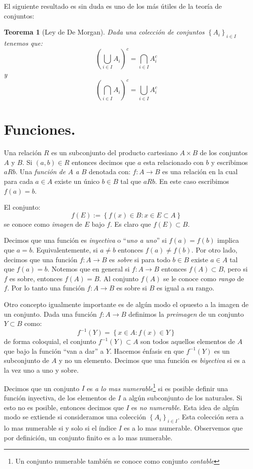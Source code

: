 \documentclass[14pt]{extreport}
\newtheorem{teo}{Teorema}
\begin{document}
El siguiente resultado es sin duda es uno de los más útiles de la teoría de conjuntos:
\begin{teo}[Ley de De Morgan]
Dada una colección de conjuntos $\left\{A_i\right\}_{i\in I}$ tenemos que:
$$
\left(\bigcup_{i\in I} A_i\right)^c =\bigcap_{i\in I} A_i^c
$$
y 
$$
\left(\bigcap_{i\in I} A_i\right)^c =\bigcup_{i\in I} A_i^c
$$
\end{teo}

\section{Funciones.}
Una relación $R$ es un subconjunto del producto cartesiano $A\times B$ de los conjuntos $A$ y $B$. Si $(a,b)\in R$ entonces decimos que $a$ esta relacionado con $b$ y escribimos $aRb$. Una \emph{función de $A$ a $B$} denotada con: $f:A\to B$ es una relación en la cual para cada $a\in A$ existe un único $b\in B$ tal que $aRb$. En este caso escribimos $f(a) = b$.

El conjunto:
$$
f(E) := \left\{f(x)\in B: x\in E\subset A\right\} 
$$
se conoce como \emph{imagen} de $E$ bajo $f$. Es claro que $f(E) \subset B$.

Decimos que una función es \emph{inyectiva} o ``\emph{uno a uno}'' si $f(a) = f(b)$ implica que $a=b$. Equivalentemente, si $a\neq b$ entonces $f(a)\neq f(b)$. Por otro lado, decimos que una función $f:A\rightarrow B$ es \emph{sobre} si para todo $b\in B$ existe $a\in A$ tal que $f(a)=b$. Notemos que en general si $f:A\rightarrow B$ entonces $f(A)\subset B$, pero si $f$ es sobre, entonces $f(A) = B$. Al conjunto $f(A)$ se le conoce como \emph{rango} de $f$. Por lo tanto una función $f:A\rightarrow B$ es sobre si $B$ es igual a su rango.

Otro concepto igualmente importante es de algún modo el opuesto a la imagen de un conjunto. Dada una función $f:A\rightarrow B$ definimos la \emph{preimagen} de un conjunto $Y \subset B$ como:
$$
f^{-1}(Y) = \left\{x\in A: f(x) \in Y\right\}
$$
de forma coloquial, el conjunto $f^{-1}(Y)\subset A$ son todos aquellos elementos de $A$ que bajo la función ``van a dar'' a $Y$. Hacemos énfasis en que $f^{-1}(Y)$ es un subconjunto de $A$ y no un elemento. Decimos que una función es \emph{biyectiva} si es a la vez uno a uno y sobre.

Decimos que un conjunto $I$ es \emph{a lo mas numerable}\footnote{Un conjunto numerable también se conoce como conjunto \emph{contable}} si es posible definir una función inyectiva, de los elementos de $I$ a algún subconjunto de los naturales. Si esto no es posible, entonces decimos que $I$ es \emph{no numerable}. Esta idea de algún modo se extiende si consideramos una colección $\left\{A_i\right\}_{i\in I}$. Esta colección sera a lo mas numerable si y solo si el índice $I$ es a lo mas numerable. Observemos que por definición, un conjunto finito es a lo mas numerable.
\end{document}
